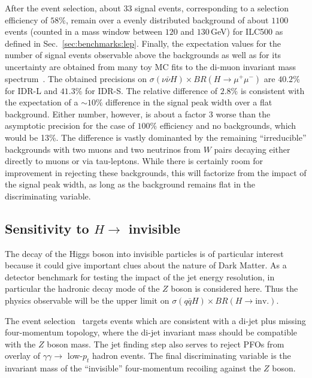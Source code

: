 After the event selection, about $33$ signal events, corresponding to a selection efficiency of $58\%$, remain over a evenly distributed background of about $1100$ events (counted in a mass window between $120$ and $130$\,GeV) for ILC500 as defined in Sec.~\ref{sec:benchmarks:lep}. Finally, the expectation values for the number of signal events observable above the backgrounds as well as for its uncertainty are obtained from many toy MC fits to the di-muon invariant mass spectrum~\cite{ILDNote:Hmumu}. The obtained precisions on $\sigma(\nu\bar{\nu} H)\times BR(H\to \mu^+\mu^-)$ are $40.2$\% for IDR-L and $41.3$\% for IDR-S. The relative difference of $2.8\%$ is consistent with the expectation of a $\sim 10\%$ difference in the signal peak width over a flat background. Either number, however, is about a factor $3$ worse than the asymptotic precision for the case of $100\%$ efficiency and no backgrounds, which would be 13\%. The difference is vastly dominanted by the remaining ``irreducible'' backgrounds with two muons and two neutrinos from $W$ pairs decaying either directly to muons or via tau-leptons. While there is certainly room for improvement in rejecting these backgrounds, this will factorize from the impact of the signal peak width, as long as the background remains flat in the discriminating variable. 
 


\subsection{Sensitivity to \texorpdfstring{$H \to $ invisible}{H -> invisible}}

The decay of the Higgs boson into invisible particles is of particular interest because
it could give important clues about the nature of Dark Matter. As a detector benchmark for testing the impact of the jet energy resolution, in particular the hadronic decay mode of the $Z$ boson is considered here. Thus the physics observable will be the upper limit on $\sigma(q\bar{q} H)\times BR(H \to \mbox{inv.})$.

The event selection~\cite{ILDNote:Hinv} targets events which are consistent with  a di-jet plus missing four-momentum topology, where the di-jet invariant mass should be compatible with the $Z$ boson mass. The jet finding step also serves to reject PFOs from overlay of $\gamma\gamma \to $ low-$p_t$ hadron events. The final discriminating variable is the
invariant mass of the ``invisible'' four-momentum recoiling against the $Z$ boson. 

